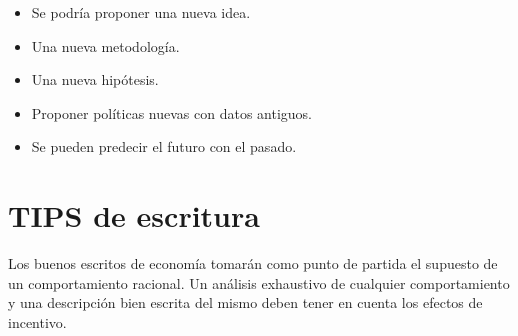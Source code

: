 \begin{itemize}
    \item Se podría proponer una nueva idea.
    \item Una nueva metodología.
    \item Una nueva hipótesis.
    \item Proponer políticas nuevas con datos antiguos.
    \item Se pueden predecir el futuro con el pasado.
\end{itemize}


\section*{TIPS de escritura}

Los buenos escritos de economía tomarán como punto de partida el supuesto de un comportamiento racional. Un análisis exhaustivo de cualquier comportamiento y una descripción bien escrita del mismo deben tener en cuenta los efectos de incentivo.
